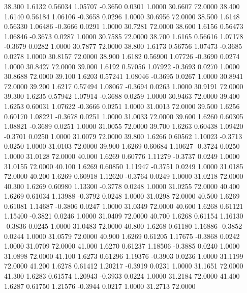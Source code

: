   38.300   1.6132   0.56034   1.05707  -0.3650   0.0301   1.0000  30.6607  72.0000
  38.400   1.6140   0.56184   1.06106  -0.3658   0.0296   1.0000  30.6956  72.0000
  38.500   1.6148   0.56330   1.06486  -0.3666   0.0291   1.0000  30.7281  72.0000
  38.600   1.6156   0.56473   1.06846  -0.3673   0.0287   1.0000  30.7585  72.0000
  38.700   1.6165   0.56616   1.07178  -0.3679   0.0282   1.0000  30.7877  72.0000
  38.800   1.6173   0.56756   1.07473  -0.3685   0.0278   1.0000  30.8157  72.0000
  38.900   1.6182   0.56900   1.07726  -0.3690   0.0274   1.0000  30.8427  72.0000
  39.000   1.6192   0.57056   1.07922  -0.3693   0.0270   1.0000  30.8688  72.0000
  39.100   1.6203   0.57241   1.08046  -0.3695   0.0267   1.0000  30.8941  72.0000
  39.200   1.6217   0.57494   1.08067  -0.3694   0.0263   1.0000  30.9191  72.0000
  39.300   1.6235   0.57942   1.07914  -0.3688   0.0259   1.0000  30.9463  72.0000
  39.400   1.6253   0.60031   1.07622  -0.3666   0.0251   1.0000  31.0013  72.0000
  39.500   1.6256   0.60170   1.08221  -0.3678   0.0251   1.0000  31.0033  72.0000
  39.600   1.6260   0.60305   1.08821  -0.3689   0.0251   1.0000  31.0055  72.0000
  39.700   1.6263   0.60438   1.09420  -0.3701   0.0250   1.0000  31.0079  72.0000
  39.800   1.6266   0.60562   1.10023  -0.3713   0.0250   1.0000  31.0103  72.0000
  39.900   1.6269   0.60684   1.10627  -0.3724   0.0250   1.0000  31.0128  72.0000
  40.000   1.6269   0.60776   1.11279  -0.3737   0.0249   1.0000  31.0155  72.0000
  40.100   1.6269   0.60850   1.11947  -0.3751   0.0249   1.0000  31.0185  72.0000
  40.200   1.6269   0.60918   1.12620  -0.3764   0.0249   1.0000  31.0218  72.0000
  40.300   1.6269   0.60980   1.13300  -0.3778   0.0248   1.0000  31.0255  72.0000
  40.400   1.6269   0.61034   1.13988  -0.3792   0.0248   1.0000  31.0298  72.0000
  40.500   1.6269   0.61081   1.14687  -0.3806   0.0247   1.0000  31.0349  72.0000
  40.600   1.6268   0.61121   1.15400  -0.3821   0.0246   1.0000  31.0409  72.0000
  40.700   1.6268   0.61154   1.16130  -0.3836   0.0245   1.0000  31.0483  72.0000
  40.800   1.6268   0.61180   1.16886  -0.3852   0.0244   1.0000  31.0579  72.0000
  40.900   1.6269   0.61205   1.17675  -0.3868   0.0242   1.0000  31.0709  72.0000
  41.000   1.6270   0.61237   1.18506  -0.3885   0.0240   1.0000  31.0898  72.0000
  41.100   1.6273   0.61296   1.19376  -0.3903   0.0236   1.0000  31.1199  72.0000
  41.200   1.6278   0.61412   1.20217  -0.3919   0.0231   1.0000  31.1651  72.0000
  41.300   1.6283   0.61574   1.20943  -0.3933   0.0224   1.0000  31.2184  72.0000
  41.400   1.6287   0.61750   1.21576  -0.3944   0.0217   1.0000  31.2713  72.0000
